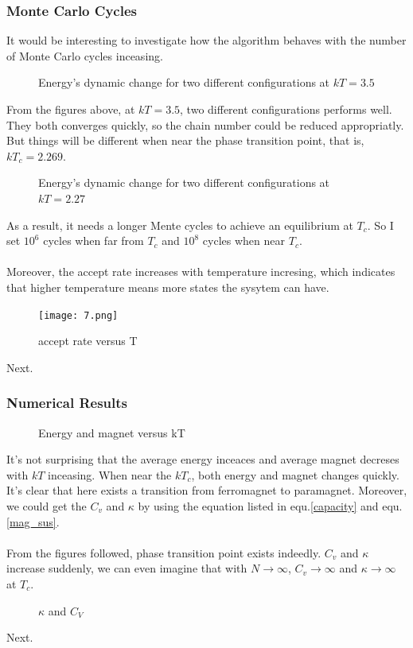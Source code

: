 \documentclass[UTF-8]{article}
\begin{document}
\subsubsection{Monte Carlo Cycles}
It would be interesting to investigate how the algorithm behaves with the number of Monte Carlo cycles inceasing.
\begin{figure}[H]
	\centering
	\caption{Energy's dynamic change for two different configurations at $kT=3.5$}
\end{figure}
From the figures above, at $kT=3.5$, two different configurations performs well. They both converges quickly, so the chain number could be reduced appropriatly. But things will be different when near the phase transition point, that is, $kT_c=2.269$.
\begin{figure}[H]
	\centering
	\caption{Energy's dynamic change for two different configurations at $kT=2.27$}
\end{figure}
As a result, it needs a longer Mente cycles to achieve an equilibrium at $T_c$. So I set $10^6$ cycles when far from $T_c$ and $10^8$ cycles when near $T_c$.\\
\\
Moreover, the accept rate increases with temperature incresing, which indicates that higher temperature means more states the sysytem can have.
\begin{figure}[H]
	\centering
	\texttt{[image: 7.png]}
	\caption{accept rate versus T}
\end{figure}
Next.

\subsubsection{Numerical Results}
\begin{figure}[H]
	\centering
	\caption{Energy and magnet versus kT}
\end{figure}
It's not surprising that the average energy inceaces and average magnet decreses with $kT$ inceasing. When near the $kT_c$, both energy and magnet changes quickly. It's clear that here exists a transition from ferromagnet to paramagnet. Moreover, we could get the $C_v$ and $\kappa$ by using the equation listed in equ.\ref{capacity} and equ.\ref{mag_sus}.\\
\\
From the figures followed, phase transition point exists indeedly. $C_v$ and $\kappa$ increase suddenly, we can even imagine that with $N\rightarrow \infty$, $C_v\rightarrow\infty$ and  $\kappa \rightarrow \infty$ at $T_c$.
\begin{figure}[H]
	\centering
	\caption{$\kappa$ and $C_V$}
\end{figure}
Next.
\end{document}

